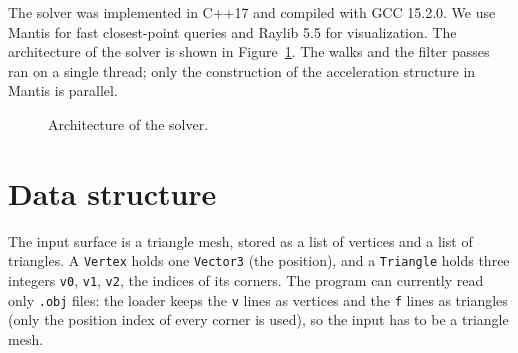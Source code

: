 \documentclass[
]{elteiktdk}[2024/04/26]
\begin{document}
	The solver was implemented in C++17 and compiled with GCC 15.2.0. We use Mantis \cite{mantis} for fast closest-point queries and Raylib 5.5 \cite{raylib55} for visualization. The architecture of the solver is shown in Figure~\ref{fig:architecture}. The walks and the filter passes ran on a single thread; only the construction of the acceleration structure in Mantis is parallel.

	\begin{figure}[ht]
		\centering
		\caption{Architecture of the solver.}
		\label{fig:architecture}
	\end{figure}
	
	\section{Data structure}
	
	The input surface is a triangle mesh, stored as a list of vertices and a list of triangles.
	A \texttt{Vertex} holds one \texttt{Vector3} (the position), and a \texttt{Triangle} holds three integers \texttt{v0}, \texttt{v1}, \texttt{v2}, the indices of its corners. The program can currently read only \texttt{.obj} files: the loader keeps the \texttt{v} lines as vertices and the \texttt{f} lines as triangles (only the position index of every corner is used), so the input has to be a triangle mesh.
	
\end{document}
